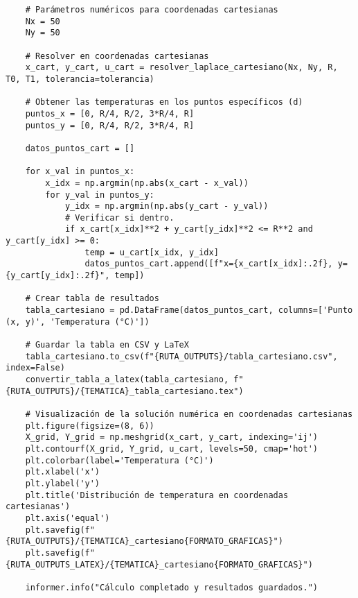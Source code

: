 \begin{verbatim}
    # Parámetros numéricos para coordenadas cartesianas
    Nx = 50
    Ny = 50

    # Resolver en coordenadas cartesianas
    x_cart, y_cart, u_cart = resolver_laplace_cartesiano(Nx, Ny, R, T0, T1, tolerancia=tolerancia)

    # Obtener las temperaturas en los puntos específicos (d)
    puntos_x = [0, R/4, R/2, 3*R/4, R]
    puntos_y = [0, R/4, R/2, 3*R/4, R]

    datos_puntos_cart = []

    for x_val in puntos_x:
        x_idx = np.argmin(np.abs(x_cart - x_val))
        for y_val in puntos_y:
            y_idx = np.argmin(np.abs(y_cart - y_val))
            # Verificar si dentro.
            if x_cart[x_idx]**2 + y_cart[y_idx]**2 <= R**2 and y_cart[y_idx] >= 0:
                temp = u_cart[x_idx, y_idx]
                datos_puntos_cart.append([f"x={x_cart[x_idx]:.2f}, y={y_cart[y_idx]:.2f}", temp])

    # Crear tabla de resultados
    tabla_cartesiano = pd.DataFrame(datos_puntos_cart, columns=['Punto (x, y)', 'Temperatura (°C)'])

    # Guardar la tabla en CSV y LaTeX
    tabla_cartesiano.to_csv(f"{RUTA_OUTPUTS}/tabla_cartesiano.csv", index=False)
    convertir_tabla_a_latex(tabla_cartesiano, f"{RUTA_OUTPUTS}/{TEMATICA}_tabla_cartesiano.tex")

    # Visualización de la solución numérica en coordenadas cartesianas
    plt.figure(figsize=(8, 6))
    X_grid, Y_grid = np.meshgrid(x_cart, y_cart, indexing='ij')
    plt.contourf(X_grid, Y_grid, u_cart, levels=50, cmap='hot')
    plt.colorbar(label='Temperatura (°C)')
    plt.xlabel('x')
    plt.ylabel('y')
    plt.title('Distribución de temperatura en coordenadas cartesianas')
    plt.axis('equal')
    plt.savefig(f"{RUTA_OUTPUTS}/{TEMATICA}_cartesiano{FORMATO_GRAFICAS}")
    plt.savefig(f"{RUTA_OUTPUTS_LATEX}/{TEMATICA}_cartesiano{FORMATO_GRAFICAS}")

    informer.info("Cálculo completado y resultados guardados.")



\end{verbatim}